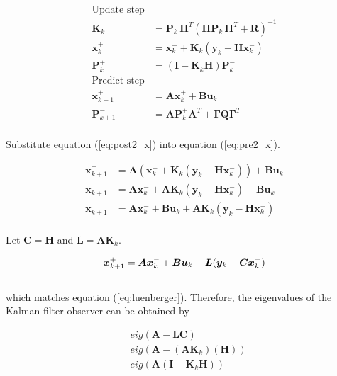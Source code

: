 \documentclass[10pt,conference,compsoc]{IEEEtran}
\newcommand{\mtx}[1] {\bm #1}
\begin{document}
\begin{align}
  \text{Update step} \nonumber \\
  \mtx{K}_k &= \mtx{P}_k^- \mtx{H}^T (\mtx{H}\mtx{P}_k^- \mtx{H}^T +
    \mtx{R})^{-1} \\
  \mtx{x}_k^+ &= \mtx{x}_k^- + \mtx{K}_k (\mtx{y}_k - \mtx{H} \mtx{x}_k^-)
    \label{eq:post2_x} \\
  \mtx{P}_k^+ &= (\mtx{I} - \mtx{K}_k\mtx{H})\mtx{P}_k^- \\
  \text{Predict step} \nonumber \\
  \mtx{x}_{k+1}^+ &= \mtx{A} \mtx{x}_k^+ + \mtx{B} \mtx{u}_k
    \label{eq:pre2_x} \\
  \mtx{P}_{k+1}^- &= \mtx{A} \mtx{P}_k^+ \mtx{A}^T +
    \mtx{\Gamma}\mtx{Q}\mtx{\Gamma}^T
\end{align}
\\
Substitute equation (\ref{eq:post2_x}) into equation (\ref{eq:pre2_x}).

\begin{align*}
  \mtx{x}_{k+1}^+ &= \mtx{A} (\mtx{x}_k^- +
    \mtx{K}_k (\mtx{y}_k - \mtx{H} \mtx{x}_k^-)) + \mtx{B} \mtx{u}_k \\
  \mtx{x}_{k+1}^+ &= \mtx{A} \mtx{x}_k^- +
    \mtx{A} \mtx{K}_k (\mtx{y}_k - \mtx{H} \mtx{x}_k^-) + \mtx{B} \mtx{u}_k \\
  \mtx{x}_{k+1}^+ &= \mtx{A} \mtx{x}_k^- + \mtx{B} \mtx{u}_k +
    \mtx{A} \mtx{K}_k (\mtx{y}_k - \mtx{H} \mtx{x}_k^-) \\
\end{align*}

Let $\mtx{C} = \mtx{H}$ and $\mtx{L} = \mtx{A} \mtx{K}_k$.

\begin{equation} \label{eq:app_kalman_leunberger}
  \mtx{x}_{k+1}^+ = \mtx{A} \mtx{x}_k^- + \mtx{B} \mtx{u}_k +
    \mtx{L} (\mtx{y}_k - \mtx{C} \mtx{x}_k^-) \\
\end{equation}
\\
which matches equation (\ref{eq:luenberger}). Therefore, the eigenvalues of the
Kalman filter observer can be obtained by

\begin{align}
  &eig(\mtx{A} - \mtx{L}\mtx{C}) \nonumber \\
  &eig(\mtx{A} - (\mtx{A}\mtx{K}_k)(\mtx{H})) \nonumber \\
  &eig(\mtx{A}(\mtx{I} - \mtx{K}_k\mtx{H}))
\end{align}
\end{document}
